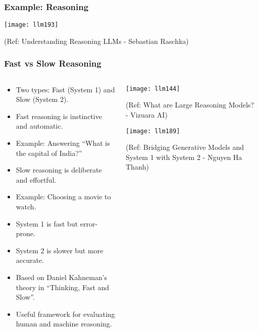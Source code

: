 \begin{frame}[fragile]\frametitle{Example: Reasoning}

		\begin{center}
		\texttt{[image: llm193]}
		
		{\tiny (Ref: Understanding Reasoning LLMs - Sebastian Raschka)}
		
		\end{center}
\end{frame}


\begin{frame}[fragile]\frametitle{Fast vs Slow Reasoning}

\begin{columns}
    \begin{column}[T]{0.6\linewidth}
		\begin{itemize}
		  \item Two types: Fast (System 1) and Slow (System 2).
		  \item Fast reasoning is instinctive and automatic.
		  \item Example: Answering ``What is the capital of India?''
		  \item Slow reasoning is deliberate and effortful.
		  \item Example: Choosing a movie to watch.
		  \item System 1 is fast but error-prone.
		  \item System 2 is slower but more accurate.
		  \item Based on Daniel Kahneman's theory in ``Thinking, Fast and Slow''.
		  \item Useful framework for evaluating human and machine reasoning.
		\end{itemize}

    \end{column}
    \begin{column}[T]{0.4\linewidth}
		\begin{center}
		\texttt{[image: llm144]}
		
		{\tiny (Ref: What are Large Reasoning Models? - Vizuara AI)}
		
		\texttt{[image: llm189]}
		
		{\tiny (Ref: Bridging Generative Models and System 1 with System 2 - Nguyen Ha Thanh)}
		
		\end{center}
    \end{column}
  \end{columns}
 
\end{frame}

